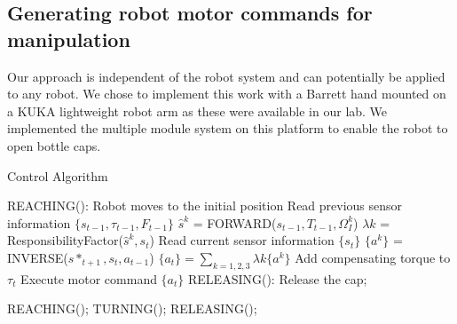 

\subsection{Generating robot motor commands for manipulation}
\label{sec:command}
Our approach is independent of the robot system and can potentially be
applied to any robot. We chose to implement this work with a Barrett
hand mounted on a KUKA lightweight robot arm as these were available in
our lab. We implemented the multiple module system on this platform to
enable the robot to open bottle caps.

\begin{algorithm}
  \caption{Control Algorithm}
  \begin{algorithmic}[1]
    \State REACHING(): Robot moves to the initial position\;
          \State Read previous sensor information $\{s_{t-1},\tau_{t-1},F_{t-1}\}$\;
            \State $\hat{s}^{k}$ = FORWARD($s_{t-1},T_{t-1},\Omega_I^k$) \;
          \EndFor
            \State $\lambda{k}$ = ResponsibilityFactor($\hat{s}^{k},s_t$) \;
          \EndFor
          \State Read current sensor information $\{s_{t}\}$\;
            \State $\{a^k\}$ = INVERSE($s*_{t+1},s_t,a_{t-1}$) \;
          \EndFor
          \State $\{a_t\} = \sum_{k=1,2,3}\lambda{k}\{a^k\}$\;\;
          \State Add compensating torque to $\tau_t$\;
          \State Execute motor command $\{a_t\}$ \;
          \State RELEASING(): Release the cap;
        \EndFunction
    \EndFor

        \State REACHING();
        \State TURNING();
        \State RELEASING();
    \EndWhile

  \end{algorithmic}
  \label{code:control}
\end{algorithm}


